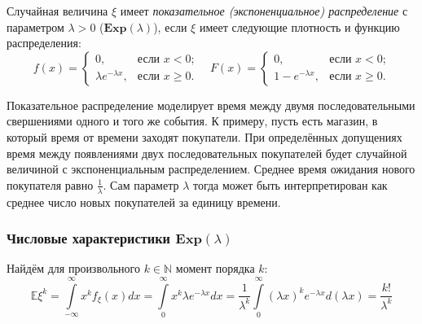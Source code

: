 \begin{defn}
    Случайная величина $\xi$ имеет {\it показательное (экспоненциальное) распределение} с параметром $\lambda > 0$ ($\mathbf{Exp}(\lambda)$), если $\xi$ имеет следующие плотность и функцию распределения:
    \begin{equation*}
        f(x) = 
        \begin{cases}
            0, & \text{если $x < 0$;} \\
            \lambda e^{-\lambda x}, & \text{если $x \geqslant 0$.}
        \end{cases}
        \quad 
        F(x) = 
        \begin{cases}
            0, & \text{если $x < 0$;} \\
            1 - e^{-\lambda x}, & \text{если $x \geqslant 0$.}
        \end{cases}
    \end{equation*}
\end{defn}

\begin{rmrk}
    Показательное распределение моделирует время между двумя последовательными свершениями одного и того же события. К примеру, пусть есть магазин, в который время от времени заходят покупатели. При определённых допущениях время между появлениями двух последовательных покупателей будет случайной величиной с экспоненциальным распределением. Среднее время ожидания нового покупателя равно $\frac{1}{\lambda}$. Сам параметр $\lambda$ тогда может быть интерпретирован как среднее число новых покупателей за единицу времени. 
\end{rmrk}

\subsubsection{Числовые характеристики $\mathbf{Exp}(\lambda)$}

Найдём для произвольного $k \in \mathbb{N}$ момент порядка $k$:
\begin{equation*}
    \mathbb{E} \xi^{k}=\int\limits_{-\infty}^{\infty} x^{k} f_{\xi}(x) d x=\int\limits_{0}^{\infty} x^{k} \lambda e^{-\lambda x} d x=\frac{1}{\lambda^{k}} \int\limits_{0}^{\infty}(\lambda x)^{k} e^{-\lambda x} d(\lambda x)=\frac{k !}{\lambda^{k}}
\end{equation*}

